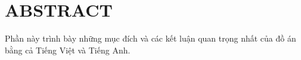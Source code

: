 \section*{ABSTRACT}
Phần này trình bày những mục đích và các kết luận quan trọng nhất của đồ án bằng cả Tiếng Việt và Tiếng Anh.
\cleardoublepage